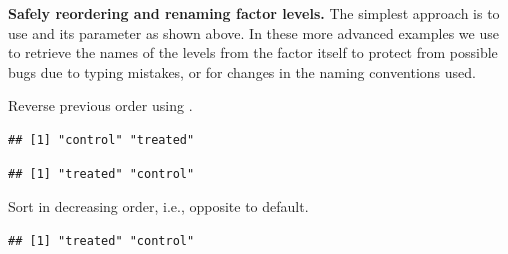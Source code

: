 \documentclass[krantz2]{krantz}\usepackage{knitr}
\begin{document}
\begin{explainbox}
\textbf{Safely reordering and renaming factor levels.} The simplest approach is to use  and its  parameter as shown above. In these more advanced examples we use  to retrieve the names of the levels from the factor itself to protect from possible bugs due to typing mistakes, or for changes in the naming conventions used.

Reverse previous order using .

\begin{knitrout}\footnotesize
{}\color{fgcolor}\begin{kframe}
\begin{alltt}
 \hlkwb{<-} \hlstd{(}\hlstd{(}\hlstd{,} \hlstd{,} \hlstd{,} \hlstd{,} \hlstd{,} \hlstd{))}
\end{alltt}
\begin{verbatim}
## [1] "control" "treated"
\end{verbatim}
\begin{alltt}
 \hlkwb{<-}   \hlstd{=} \hlstd{(}
\end{alltt}
\begin{verbatim}
## [1] "treated" "control"
\end{verbatim}
\end{kframe}
\end{knitrout}

Sort in decreasing order, i.e., opposite to default.

\begin{knitrout}\footnotesize
{}\color{fgcolor}\begin{kframe}
\begin{alltt}
 \hlkwb{<-} 
                      \hlstd{=} \hlstd{(}  \hlstd{=} \hlstd{))}
\end{alltt}
\begin{verbatim}
## [1] "treated" "control"
\end{verbatim}
\end{kframe}
\end{knitrout}


\end{explainbox}
\end{document}
